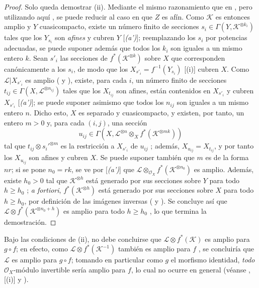 \documentclass[oneside,10pt]{amsart}
\renewcommand{\geq}{\geqslant}
\newcommand{\oldpage}[2][]{\marginnote{\normalfont\footnotesize\textbf{#1}~|~#2}\ignorespaces}
\let\EGAOriginalLabel\label
\renewcommand{\label}[1]{\phantomsection\EGAOriginalLabel{#1}}
\begin{document}
\begin{proof}
Solo queda demostrar (ii).
Mediante el mismo razonamiento que en , pero utilizando aquí , se puede reducir al caso en que $Z$ es afín.
Como $\mathcal{K}$ es entonces amplio y $Y$ cuasicompacto, existe un número finito de secciones $s_i\in\Gamma(Y,\mathcal{K}^{\otimes k_i})$ tales que los $Y_{s_i}$
\oldpage[II]{93}
son \emph{afines} y cubren $Y$ [\emph{(a')}];
reemplazando los $s_i$ por potencias adecuadas, se puede suponer además que todos los $k_i$ son iguales a un mismo entero $k$.
Sean $s'_i$ las secciones de $f^*(\mathcal{K}^{\otimes k})$ sobre $X$ que corresponden canónicamente a los $s_i$, de modo que los $X_{s'_i}=f^{-1}(Y_{s_i})$ [(i)] cubren $X$.
Como $\mathcal{L}|X_{s'_i}$ es amplio ( y ), existe, para cada $i$, un número finito de secciones $t_{ij}\in\Gamma(X,\mathcal{L}^{\otimes n_{ij}})$ tales que los $X_{t_{ij}}$ son afines, están contenidos en $X_{s'_i}$ y cubren $X_{s'_i}$ [\emph{(a')}];
se puede suponer asimismo que todos los $n_{ij}$ son iguales a un mismo entero $n$.
Dicho esto, $X$ es separado y cuasicompacto, y existen, por tanto, un entero $m>0$ y, para cada $(i,j)$, una sección
\[
  u_{ij}\in\Gamma(X,\mathcal{L}^{\otimes n}\otimes_X
  f^*(\mathcal{K}^{\otimes mk}))
\]
tal que $t_{ij}\otimes s_i'^{\otimes m}$ es la restricción a $X_{s'_i}$ de $u_{ij}$ ;
además, $X_{u_{ij}}=X_{t_{ij}}$, y por tanto los $X_{u_{ij}}$ son afines y cubren $X$.
Se puede suponer también que $m$ es de la forma $nr$;
si se pone $n_0=rk$, se ve por [\emph{(a')}] que $\mathcal{L}\otimes_{\mathcal{O}_X}f^*(\mathcal{K}^{\otimes n_0})$ es amplio.
Además, existe $h_0>0$ tal que $\mathcal{K}^{\otimes h}$ está generado por sus secciones sobre $Y$ para todo $h\geq h_0$ ;
\emph{a fortiori}, $f^*(\mathcal{K}^{\otimes h})$ está generado por sus secciones sobre $X$ para todo $h\geq h_0$, por definición de las imágenes inversas ( y ).
Se concluye así que $\mathcal{L}\otimes f^*(\mathcal{K}^{\otimes n_0+h})$ es amplio para todo $h\geq h_0$ , lo que termina la demostración.
\end{proof}

\begin{remark}[4.6.14]
\label{II.4.6.14-fr}
Bajo las condiciones de (ii), no debe concluirse que $\mathcal{L}\otimes f^*(\mathcal{K})$ es amplio para $g\circ f$;
en efecto, como $\mathcal{L}\otimes f^*(\mathcal{K}^{-1})$ también es amplio para $f$ , se concluiría que $\mathcal{L}$ es amplio para $g\circ f$;
tomando en particular como $g$ el morfismo identidad, \emph{todo} $\mathcal{O}_X$-módulo invertible sería amplio para $f$, lo cual no ocurre en general (véanse , [(i)] y ).
\end{remark}
\end{document}
